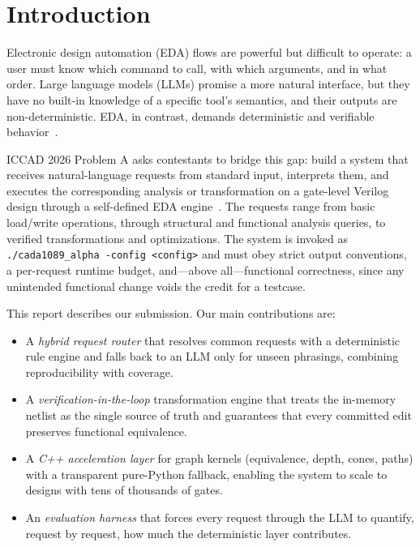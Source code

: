 \documentclass[conference]{IEEEtran}
\begin{document}
\section{Introduction}
Electronic design automation (EDA) flows are powerful but difficult to
operate: a user must know which command to call, with which arguments, and
in what order. Large language models (LLMs) promise a more natural interface,
but they have no built-in knowledge of a specific tool's semantics, and their
outputs are non-deterministic. EDA, in contrast, demands deterministic and
verifiable behavior~\cite{problemA}.

ICCAD 2026 Problem A asks contestants to bridge this gap: build a system that
receives natural-language requests from standard input, interprets them, and
executes the corresponding analysis or transformation on a gate-level Verilog
design through a self-defined EDA engine~\cite{problemA}. The requests range
from basic load/write operations, through structural and functional analysis
queries, to verified transformations and optimizations. The system is invoked
as \texttt{./cada1089\_alpha -config <config>} and must obey strict output
conventions, a per-request runtime budget, and---above all---functional
correctness, since any unintended functional change voids the credit for a
testcase.

This report describes our submission. Our main contributions are:
\begin{itemize}
\item A \emph{hybrid request router} that resolves common requests with a
deterministic rule engine and falls back to an LLM only for unseen phrasings,
combining reproducibility with coverage.
\item A \emph{verification-in-the-loop} transformation engine that treats the
in-memory netlist as the single source of truth and guarantees that every
committed edit preserves functional equivalence.
\item A \emph{C++ acceleration layer} for graph kernels (equivalence, depth,
cones, paths) with a transparent pure-Python fallback, enabling the system to
scale to designs with tens of thousands of gates.
\item An \emph{evaluation harness} that forces every request through the LLM to
quantify, request by request, how much the deterministic layer contributes.
\end{itemize}
\end{document}
